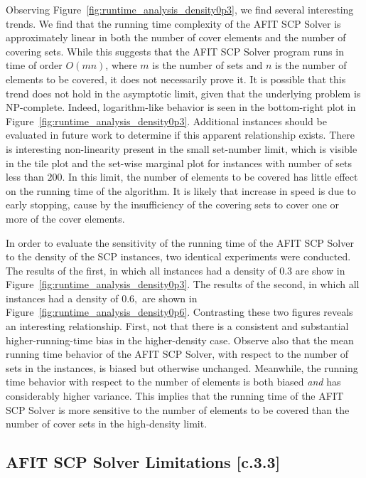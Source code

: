 \documentclass[12pt]{article}
\begin{document}
Observing Figure~\ref{fig:runtime_analysis_density0p3}, we find several interesting trends. We find that the running time complexity of the AFIT SCP Solver is approximately linear in both the number of cover elements and the number of covering sets. While this suggests that the AFIT SCP Solver program runs in time of order $O(mn)$, where $m$ is the number of sets and $n$ is the number of elements to be covered, it does not necessarily prove it. It is possible that this trend does not hold in the asymptotic limit, given that the underlying problem is NP-complete. Indeed, logarithm-like behavior is seen in the bottom-right plot in Figure~\ref{fig:runtime_analysis_density0p3}. Additional instances should be evaluated in future work to determine if this apparent relationship exists.
There is interesting non-linearity present in the small set-number limit, which is visible in the tile plot and the set-wise marginal plot for instances with number of sets less than $200$. In this limit, the number of elements to be covered has little effect on the running time of the algorithm. It is likely that increase in speed is due to early stopping, cause by the insufficiency of the covering sets to cover one or more of the cover elements.

In order to evaluate the sensitivity of the running time of the AFIT SCP Solver to the density of the SCP instances, two identical experiments were conducted. The results of the first, in which all instances had a density of $0.3$ are show in Figure~\ref{fig:runtime_analysis_density0p3}. The results of the second, in which all instances had a density of $0.6,$ are shown in Figure~\ref{fig:runtime_analysis_density0p6}. Contrasting these two figures reveals an interesting relationship. First, not that there is a consistent and substantial higher-running-time bias in the higher-density case. Observe also that the mean running time behavior of the AFIT SCP Solver, with respect to the number of sets in the instances, is biased but otherwise unchanged. Meanwhile, the running time behavior with respect to the number of elements is both biased \emph{and} has considerably higher variance. This implies that the running time of the AFIT SCP Solver is more sensitive to the number of elements to be covered than the number of cover sets in the high-density limit. 

\subsection{AFIT SCP Solver Limitations [c.3.3]} \label{scn:testing_limitations}
\end{document}
